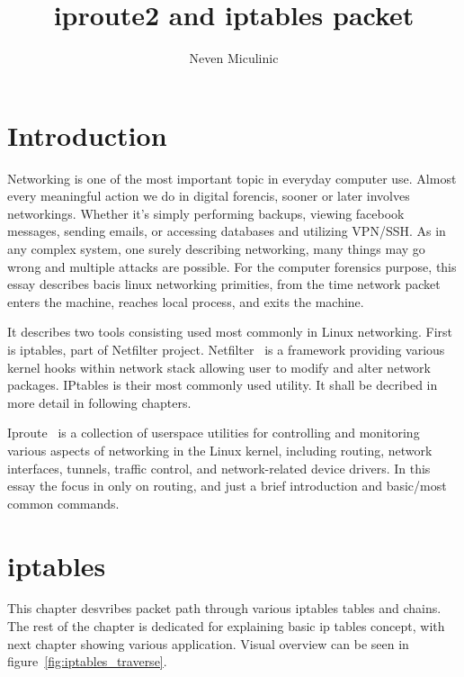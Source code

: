 \documentclass[times, utf8, seminar, english]{fer}
\begin{document}
\theoremstyle{definition}
\newtheorem{definition}{Definition}[section]
\title{iproute2 and iptables packet}
\author{Neven Miculinic}

\maketitle
\tableofcontents

\chapter{Introduction}

Networking is one of the most important topic in everyday computer use. Almost every meaningful action we do in digital forencis, sooner or later involves networkings. Whether it's simply performing backups, viewing facebook messages, sending emails, or accessing databases and utilizing VPN/SSH.
As in any complex system, one surely describing networking, many things may go wrong and multiple attacks are possible. For the computer forensics purpose, this essay describes bacis linux networking primities, from the time network packet enters the machine, reaches local process, and exits the machine.

It describes two tools consisting used most commonly in Linux networking. First is iptables, part of Netfilter project. Netfilter~\cite{netfilte6:online} is a framework providing various kernel hooks within network stack allowing user to modify and alter network packages. IPtables is their most commonly used utility. It shall be decribed in more detail in following chapters.

Iproute~\cite{shemming47:online} is a collection of userspace utilities for controlling and monitoring various aspects of networking in the Linux kernel, including routing, network interfaces, tunnels, traffic control, and network-related device drivers. In this essay the focus in only on routing, and just a brief introduction and basic/most common commands.

\chapter{iptables}
This chapter desvribes packet path through various iptables tables and chains. The rest of the chapter is dedicated for explaining basic ip tables concept, with next chapter showing various application.
Visual overview can be seen in figure~\ref{fig:iptables_traverse}.
\end{document}
